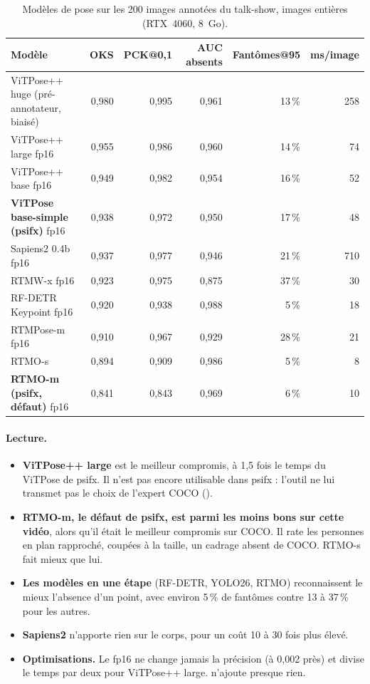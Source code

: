 \documentclass[11pt,a4paper]{report}
\newcommand{\code}[1]{\texttt{\detokenize{#1}}}
\begin{document}
\begin{table}[H]
\centering
\caption{Modèles de pose sur les 200 images annotées du talk-show, images entières (RTX~4060, 8~Go).}
\label{tab:hf-pose}
\small
\begin{tabular}{@{}lrrrrr@{}}
\toprule
Modèle & OKS & PCK@0,1 & AUC absents & Fantômes@95 & ms/image \\
\midrule
ViTPose++ huge (pré-annotateur, biaisé) & 0,980 & 0,995 & 0,961 & 13\,\% & 258 \\
ViTPose++ large fp16 & 0,955 & 0,986 & 0,960 & 14\,\% & 74 \\
ViTPose++ base fp16 & 0,949 & 0,982 & 0,954 & 16\,\% & 52 \\
\textbf{ViTPose base-simple (psifx)} fp16 & 0,938 & 0,972 & 0,950 & 17\,\% & 48 \\
Sapiens2 0.4b fp16 & 0,937 & 0,977 & 0,946 & 21\,\% & 710 \\
RTMW-x fp16 & 0,923 & 0,975 & 0,875 & 37\,\% & 30 \\
RF-DETR Keypoint fp16 & 0,920 & 0,938 & 0,988 & 5\,\% & 18 \\
RTMPose-m fp16 & 0,910 & 0,967 & 0,929 & 28\,\% & 21 \\
RTMO-s & 0,894 & 0,909 & 0,986 & 5\,\% & 8 \\
\textbf{RTMO-m (psifx, défaut)} fp16 & 0,841 & 0,843 & 0,969 & 6\,\% & 10 \\
\bottomrule
\end{tabular}
\end{table}

\paragraph{Lecture.}
\begin{itemize}
    \item \textbf{ViTPose++ large} est le meilleur compromis, à 1,5 fois le temps du ViTPose de psifx. Il n'est pas encore
    utilisable dans psifx : l'outil ne lui transmet pas le choix de l'expert COCO (\code{dataset_index}).
    \item \textbf{RTMO-m, le défaut de psifx, est parmi les moins bons sur cette vidéo}, alors qu'il était le meilleur
    compromis sur COCO. Il rate les personnes en plan rapproché, coupées à la taille, un cadrage absent de COCO. RTMO-s fait
    mieux que lui.
    \item \textbf{Les modèles en une étape} (RF-DETR, YOLO26, RTMO) reconnaissent le mieux l'absence d'un point, avec
    environ 5\,\% de fantômes contre 13 à 37\,\% pour les autres.
    \item \textbf{Sapiens2} n'apporte rien sur le corps, pour un coût 10 à 30 fois plus élevé.
    \item \textbf{Optimisations.} Le fp16 ne change jamais la précision (à 0,002 près) et divise le temps par deux pour
    ViTPose++ large. \code{torch.compile} n'ajoute presque rien.
\end{itemize}
\end{document}
